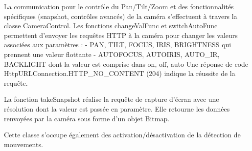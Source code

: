 La communication pour le contrôle du Pan/Tilt/Zoom et des fonctionnalités spécifiques (snapshot, contrôles avancés) de la caméra s'effectuent à travers la classe CameraControl.
Les fonctions changeValFunc et switchAutoFunc permettent d'envoyer les requêtes HTTP à la caméra pour changer les valeurs associées aux paramètres :
- PAN, TILT, FOCUS, IRIS, BRIGHTNESS qui prennent une valeur flottante
- AUTOFOCUS, AUTOIRIS, AUTO_IR, BACKLIGHT dont la valeur est comprise dans { on, off, auto }
Une réponse de code HttpURLConnection.HTTP_NO_CONTENT (204) indique la réussite de la requête.

La fonction takeSnapshot réalise la requête de capture d'écran avec une résolution dont la valeur est passée en paramètre.
Elle retourne les données renvoyées par la caméra sous forme d'un objet Bitmap.


Cette classe s'occupe également des activation/désactivation de la détection de mouvements.